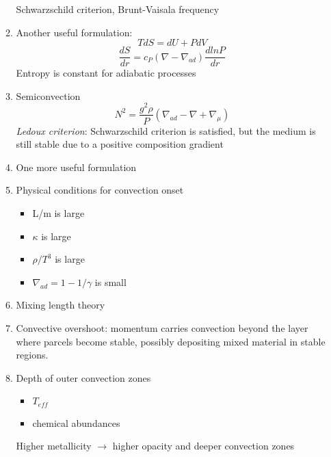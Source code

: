 \documentclass{article}
\begin{document}
\begin{enumerate}
\begin{enumerate}
                Schwarzschild criterion, Brunt-Vaisala frequency
            \item Another useful formulation:
                \[
                    T dS = dU + PdV
                    \]
                \[
                    \frac{dS}{dr} = c_{P} (\nabla - \nabla_{ad})
                    \frac{d ln P}{dr}
                    \]
                Entropy is constant for adiabatic processes
            \item Semiconvection
                \[
                    N^{2} = \frac{g^{2}\rho}{P}
                    \left( \nabla_{ad} - \nabla + \nabla_{\mu} \right)
                    \]
                \textit{Ledoux criterion}:
                Schwarzschild criterion is satisfied, but the medium is still
                stable due to a positive composition gradient
            \item One more useful formulation
            \item Physical conditions for convection onset
                \begin{itemize}
                    \item L/m is large
                    \item $\kappa$ is large
                    \item $\rho/T^{3}$ is large
                    \item $\nabla_{ad} = 1 - 1/\gamma $ is small
                \end{itemize}
            \item Mixing length theory
            \item Convective overshoot: momentum carries convection beyond the layer
                where parcels become stable, possibly depositing mixed material in
                stable regions.
            \item Depth of outer convection zones
                \begin{itemize}
                  \item $T_{eff}$
                  \item chemical abundances
                \end{itemize}
                Higher metallicity $\longrightarrow$ higher opacity and deeper
                convection zones
        \end{enumerate}
\end{enumerate}

\newpage
\end{document}
